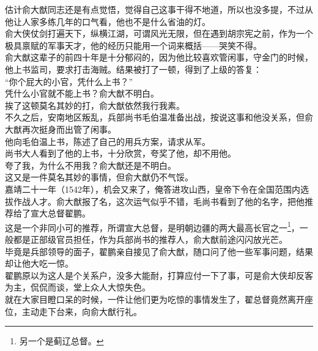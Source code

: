 \begin{multicols}{\theparacolNo}
估计俞大猷同志还是有点觉悟，觉得自己这事干得不地道，所以也没多提，不过从他让人家多练几年的口气看，他也不是什么省油的灯。\\

俞大侠仗剑打遍天下，纵横江湖，可谓风光无限，但在遇到胡宗宪之前，作为一个极具禀赋的军事天才，他的经历只能用一个词来概括——哭笑不得。\\

俞大猷这辈子的前四十年是十分郁闷的，因为他比较喜欢管闲事，守金门的时候，他上书监司，要求打击海贼。结果被打了一顿，得到了上级的答复：\\

“你个屁大的小官，凭什么上书？”\\

凭什么小官就不能上书？俞大猷不明白。\\

挨了这顿莫名其妙的打，俞大猷依然我行我素。\\

不久之后，安南地区叛乱，兵部尚书毛伯温准备出战，按说这事和他没关系，但俞大猷再次挺身而出管了闲事。\\

他向毛伯温上书，陈述了自己的用兵方案，请求从军。\\

尚书大人看到了他的上书，十分欣赏，夸奖了他，却不用他。\\

夸了我，为什么不用我？俞大猷还是不明白。\\

这又是一件莫名其妙的事情，但俞大猷仍不气馁。\\

嘉靖二十一年（1542年），机会又来了，俺答进攻山西，皇帝下令在全国范围内选拔作战人才。俞大猷报了名，这次运气似乎不错，毛尚书看到了他的名字，把他推荐给了宣大总督翟鹏。\\

这是一个非同小可的推荐，所谓宣大总督，是明朝边疆的两大最高长官之一\footnote{另一个是蓟辽总督。}，一般都是正部级官员担任，作为兵部尚书的推荐人，俞大猷前途闪闪放光芒。\\

毕竟是兵部领导的面子，翟鹏亲自接见了俞大猷，随口问了他一些军事问题，结果却让他大吃一惊。\\

翟鹏原以为这人是个关系户，没多大能耐，打算应付一下了事，可是俞大侠却反客为主，侃侃而谈，堂上众人大惊失色。\\

就在大家目瞪口呆的时候，一件让他们更为吃惊的事情发生了，翟总督竟然离开座位，主动走下台来，向俞大猷行礼。\\


\end{multicols}
